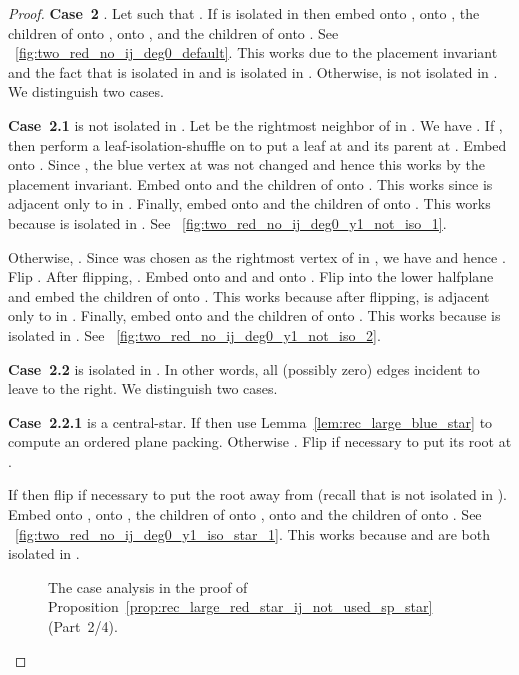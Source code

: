 \documentclass[11pt,a4paper,colorlinks=true,urlcolor=blue,citecolor=red]{article}
\theoremstyle{plain}
\newcommand{\case}[1]{\par\vspace{.5\baselineskip}\noindent\textbf{\sffamily Case~#1}}
\begin{document}
\begin{proof}
  \case{2} . Let  such that . If  is
  isolated in  then embed  onto ,  onto , the
  children of  onto ,  onto , and the children of
   onto . See
  \figurename~\ref{fig:two_red_no_ij_deg0_default}. This works due to
  the placement invariant and the fact that  is isolated in 
  and  is isolated in . Otherwise,  is not isolated in
  . We distinguish two cases.

  \case{2.1}  is not isolated in . Let  be the
  rightmost neighbor of  in . We have . If
  , then perform a leaf-isolation-shuffle on  to put a
  leaf at  and its parent at . Embed  onto . Since ,
  the blue vertex at  was not changed and hence this works by the
  placement invariant. Embed  onto  and the children of  onto
  . This works since  is adjacent only to  in
  . Finally, embed  onto  and the children of  onto
  . This works because  is isolated in . See
  \figurename~\ref{fig:two_red_no_ij_deg0_y1_not_iso_1}.

  Otherwise, . Since  was chosen as the rightmost vertex of
   in , we have  and hence
  . Flip . After flipping,
  . Embed  onto  and and  onto . Flip
   into the lower halfplane and embed the children of 
  onto . This works because after flipping,  is adjacent
  only to  in . Finally, embed  onto  and the
  children of  onto . This works because  is isolated
  in . See
  \figurename~\ref{fig:two_red_no_ij_deg0_y1_not_iso_2}.

  \case{2.2}  is isolated in . In other words, all
  (possibly zero) edges incident to  leave  to the right. We
  distinguish two cases.

  \case{2.2.1}  is a central-star. If
   then use Lemma~\ref{lem:rec_large_blue_star}
  to compute an ordered plane packing. Otherwise
  . Flip  if necessary to put
  its root at .

  If  then flip  if necessary to put the
  root away from  (recall that  is not isolated in ).
  Embed  onto ,  onto , the children of  onto
  ,  onto  and the children of  onto .
  See \figurename~\ref{fig:two_red_no_ij_deg0_y1_iso_star_1}. This works
  because  and  are both isolated in .

  \begin{figure}
    \centering\hfil {}\hfil {}\hfil \label{fig:two_red_no_ij_2}
    \caption{The case analysis in the proof of
      Proposition~\ref{prop:rec_large_red_star_ij_not_used_sp_star}
      (Part~2/4).}
  \end{figure}


\end{proof}
\end{document}
